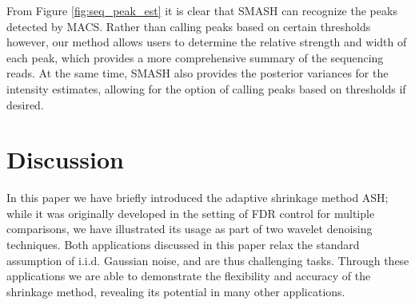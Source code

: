 \documentclass[12pt]{article}
\begin{document}
From Figure \ref{fig:seq_peak_est} it is clear that SMASH can recognize the peaks detected by MACS. Rather than calling peaks based on certain thresholds however, our method allows users to determine the relative strength and width of each peak, which provides a more comprehensive summary of the sequencing reads. At the same time, SMASH also provides the posterior variances for the intensity estimates, allowing for the option of calling peaks based on thresholds if desired.\\
\section{Discussion}
In this paper we have briefly introduced the adaptive shrinkage method ASH; while it was originally developed in the setting of FDR control for multiple comparisons, we have illustrated its usage as part of two wavelet denoising techniques. Both applications discussed in this paper relax the standard assumption of i.i.d. Gaussian noise, and are thus challenging tasks. Through these applications we are able to demonstrate the flexibility and accuracy of the shrinkage method, revealing its potential in many other applications.
\end{document}
